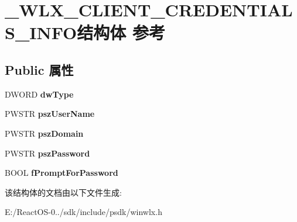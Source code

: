 \hypertarget{struct___w_l_x___c_l_i_e_n_t___c_r_e_d_e_n_t_i_a_l_s___i_n_f_o}{}\section{\+\_\+\+W\+L\+X\+\_\+\+C\+L\+I\+E\+N\+T\+\_\+\+C\+R\+E\+D\+E\+N\+T\+I\+A\+L\+S\+\_\+\+I\+N\+F\+O结构体 参考}
\label{struct___w_l_x___c_l_i_e_n_t___c_r_e_d_e_n_t_i_a_l_s___i_n_f_o}
\subsection*{Public 属性}
\begin{DoxyCompactItemize}
\item 
\mbox{\label{struct___w_l_x___c_l_i_e_n_t___c_r_e_d_e_n_t_i_a_l_s___i_n_f_o_aea0e171171935b755867087ada1e2c50}} 
D\+W\+O\+RD {\bfseries dw\+Type}
\item 
\mbox{\label{struct___w_l_x___c_l_i_e_n_t___c_r_e_d_e_n_t_i_a_l_s___i_n_f_o_ab441c613071481d445f11bf5f2a5d36b}} 
P\+W\+S\+TR {\bfseries psz\+User\+Name}
\item 
\mbox{\label{struct___w_l_x___c_l_i_e_n_t___c_r_e_d_e_n_t_i_a_l_s___i_n_f_o_afa97e3429e05341021244179e63a16d5}} 
P\+W\+S\+TR {\bfseries psz\+Domain}
\item 
\mbox{\label{struct___w_l_x___c_l_i_e_n_t___c_r_e_d_e_n_t_i_a_l_s___i_n_f_o_aabbdcd917828ca3dbc149a27d6135a98}} 
P\+W\+S\+TR {\bfseries psz\+Password}
\item 
\mbox{\label{struct___w_l_x___c_l_i_e_n_t___c_r_e_d_e_n_t_i_a_l_s___i_n_f_o_a59b51473fbf5219b840f58add7544ddb}} 
B\+O\+OL {\bfseries f\+Prompt\+For\+Password}
\end{DoxyCompactItemize}


该结构体的文档由以下文件生成\+:\begin{DoxyCompactItemize}
\item 
E\+:/\+React\+O\+S-\/0../sdk/include/psdk/winwlx.\+h\end{DoxyCompactItemize}
